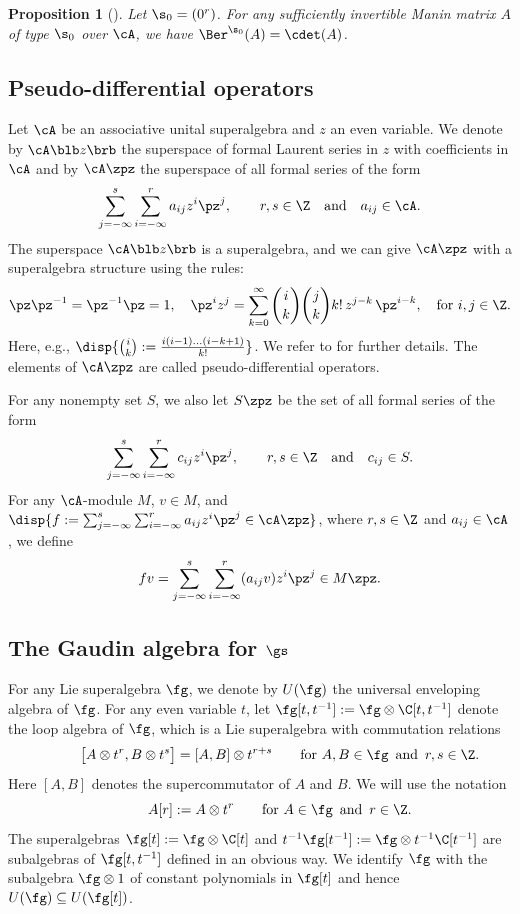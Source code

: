 \documentclass[11pt, reqno]{amsart}
\newtheorem{prop}[thm]{Proposition}
\theoremstyle{definition}
\theoremstyle{remark}
\numberwithin{equation}{section}
\begin{document}
\begin{prop}[{\cite[Lemma 8]{CFR}}] \label{CFR}
Let $\s_0=(0^r)$. For any sufficiently invertible Manin matrix $A$ of type $\s_0$ over $\cA$, we have $\Ber^{\s_0} (A)=\cdet (A)$.
\end{prop}


\subsection{Pseudo-differential operators} \label{diff-op}

Let $\cA$ be an associative unital superalgebra and $z$ an even variable.
We denote by $\cA \blb z \brb$ the superspace of formal Laurent series in $z$ with coefficients in $\cA$ and by $\cA\zpz$ the superspace of all formal series of the form
$$
  \sum_{j=-\infty}^s \sum_{i=-\infty}^r a_{i j} z^i \pz^j, \qquad  r, s \in \Z \quad \text{and} \quad a_{i j} \in \cA.
$$
The superspace $\cA \blb z \brb$ is a superalgebra, and we can give $\cA \zpz$ with a superalgebra structure using the rules:
\begin{equation} \label{rule}
\pz \pz^{-1}=\pz^{-1} \pz=1, \quad\pz^{i} z^j=\sum_{k=0}^{\infty}  \binom{i}{k} \binom{j}{k} k! \,   z^{j-k} \, \pz^{i-k},  \quad \mbox{for $i, j \in \Z$.}
\end{equation}
Here, e.g., $\disp{\binom{i}{k}:=\frac{i(i-1)\ldots (i-k+1)}{k!}}$.
We refer to \cite[Section 2.3]{ChL26-1} for further details.
The elements of $\cA\zpz$ are called pseudo-differential operators.

For any nonempty set $S$, we also let $S \zpz$ be the set of all formal series of the form
$$
  \sum_{j=-\infty}^s \sum_{i=-\infty}^r c_{i j} z^i \pz^j, \qquad  r, s \in \Z \quad \text{and} \quad c_{i j} \in S.
$$
For any $\cA$-module $M$, $v \in M$, and $\disp{f:=\sum_{j=-\infty}^s \sum_{i=-\infty}^r a_{ij} z^i \pz^j \in \cA\zpz}$, where $r, s \in \Z$ and $a_{i j} \in \cA$, we define
$$
f v=\sum_{j=-\infty}^s \sum_{i=-\infty}^r (a_{ij} v) z^i \pz^j \in M \zpz.
$$


\subsection{The Gaudin algebra for $\gs$}

For any Lie superalgebra $\fg$, we denote by $U(\fg)$ the universal enveloping algebra of $\fg$.
For any even variable $t$, let $\fg[t, t^{-1}]:=\fg\otimes \C[t, t^{-1}]$ denote the loop algebra of $\fg$, which is a Lie superalgebra with commutation relations
$$
\hspace{1cm}  \big[A \otimes t^r, B \otimes t^s \big]=[A, B] \otimes t^{r+s} \qquad \mbox{for $A, B \in \fg \,$ and $\, r, s \in \Z$.}
$$
Here $[A, B]$ denotes the supercommutator of $A$ and $B$.
We will use the notation
$$
\hspace{1cm} A[r]:=A \otimes t^r \qquad \mbox{for $A \in \fg\,$ and $\,r \in \Z$.}
$$
The superalgebras $\fg[t]:=\fg \otimes \C[t]$ and $t^{-1} \fg[t^{-1}]:=\fg \otimes t^{-1}\C[t^{-1}]$ are subalgebras of $\fg[t, t^{-1}]$ defined in an obvious way.
We identify $\fg$ with the subalgebra $\fg\otimes 1$ of constant polynomials in $\fg[t]$ and hence $U(\fg) \subseteq U(\fg[t])$.
\end{document}
